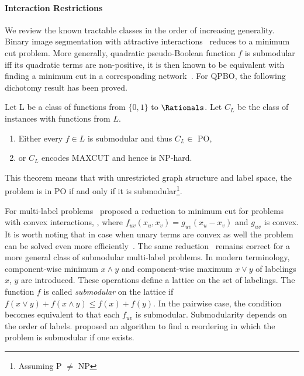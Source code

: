 \paragraph{Interaction Restrictions}
We review the known tractable classes in the order of increasing generality.
Binary image segmentation with attractive interactions~\cite{Greig89} reduces to a minimum cut problem. More generally, quadratic pseudo-Boolean function $f$ is submodular iff its quadratic terms are non-positive, it is then known to be equivalent with finding a minimum cut in a corresponding network~\cite{Hammer:OR68}.
For QPBO, the following dichotomy result has been proved.
 \begin{theorem}
 Let L be a class of functions from $\{0, 1\}$ to $\Rationals$. Let $C_L$ be the
 class of instances with functions from $L$.
 \begin{enumerate}
 \item Either every $f \in L$ is submodular and thus $C_L \in $ PO,
 \item or $C_L$ encodes MAXCUT and hence is NP-hard.
 \end{enumerate}
 \end{theorem}
\noindent This theorem means that with unrestricted graph structure and label space, the problem is in PO if and only if it is submodular\footnote{Assuming P $\neq$ NP}.
\par
For multi-label problems~\citet{Ishikawa03} proposed a reduction to minimum cut for problems with convex interactions, \ie, where $f_{uv}(x_u,x_v) = g_{uv}(x_u - x_v)$ and $g_{uv}$ is convex. %
It is worth noting that in case when unary terms are convex as well the problem can be solved even more efficiently~\cite{Hochbaum-2001-MRF,Kolmogorov05primal-dualalgorithm}. %
The same reduction~\cite{Ishikawa03} remains correct for a more general class of submodular multi-label problems. In modern terminology, component-wise minimum $x \wedge y$ and component-wise maximum $x \vee y$ of labelings $x$, $y$ are introduced. These operations define a lattice on the set of labelings. The function $f$ is called {\em submodular} on the lattice if $f(x \vee y) + f(x \wedge y) \leq f(x) + f(y)$. In the pairwise case, the condition becomes equivalent to that each $f_{uv}$ is submodular.
Submodularity depends on the order of labels. \citet{DSchlesinger-07-permuted} proposed an algorithm to find a reordering in which the problem is submodular if one exists.
